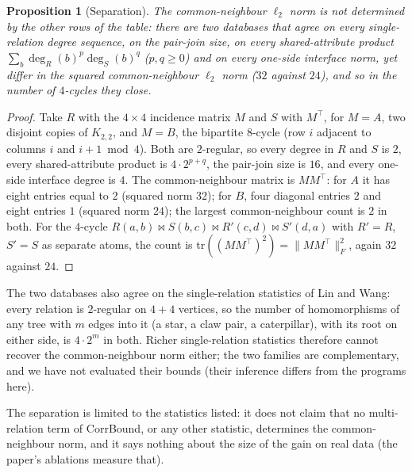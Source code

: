 \documentclass[11pt]{article}
\newtheorem{proposition}{Proposition}
\begin{document}
\begin{proposition}[Separation]\label{prop:separation}
The common-neighbour $\ell_2$ norm is not determined by the other rows of
the table: there are two databases that agree on every single-relation
degree sequence, on the pair-join size, on every shared-attribute product
$\sum_b\deg_R(b)^p\deg_S(b)^q$ ($p,q\ge0$) and on every one-side interface
norm, yet differ in the squared common-neighbour $\ell_2$ norm ($32$
against $24$), and so in the number of $4$-cycles they close.
\end{proposition}
\begin{proof}
Take $R$ with the $4\times4$ incidence matrix $M$ and $S$ with $M^{\top}$,
for $M=A$, two disjoint copies of $K_{2,2}$, and $M=B$, the bipartite
$8$-cycle (row $i$ adjacent to columns $i$ and $i{+}1 \bmod 4$). Both are
$2$-regular, so every degree in $R$ and $S$ is $2$, every shared-attribute
product is $4\cdot2^{p+q}$, the pair-join size is $16$, and every one-side
interface degree is $4$. The common-neighbour matrix is $MM^{\top}$: for
$A$ it has eight entries equal to $2$ (squared norm $32$); for $B$, four
diagonal entries $2$ and eight entries $1$ (squared norm $24$); the largest
common-neighbour count is $2$ in both. For the $4$-cycle
$R(a,b)\bowtie S(b,c)\bowtie R'(c,d)\bowtie S'(d,a)$ with $R'=R$, $S'=S$
as separate atoms, the count is $\mathrm{tr}((MM^{\top})^2)=\|MM^{\top}\|_F^2$,
again $32$ against $24$.
\end{proof}

The two databases also agree on the single-relation statistics of Lin and
Wang: every relation is $2$-regular on $4+4$ vertices, so the number of
homomorphisms of any tree with $m$ edges into it (a star, a claw pair, a
caterpillar), with its root on either side, is $4\cdot2^{m}$ in both.
Richer single-relation statistics therefore cannot recover the
common-neighbour norm either; the two families are complementary, and we
have not evaluated their bounds (their inference differs from the
programs here).

The separation is limited to the statistics listed: it does not claim that
no multi-relation term of CorrBound, or any other statistic, determines the
common-neighbour norm, and it says nothing about the size of the gain on
real data (the paper's ablations measure that).
\end{document}
